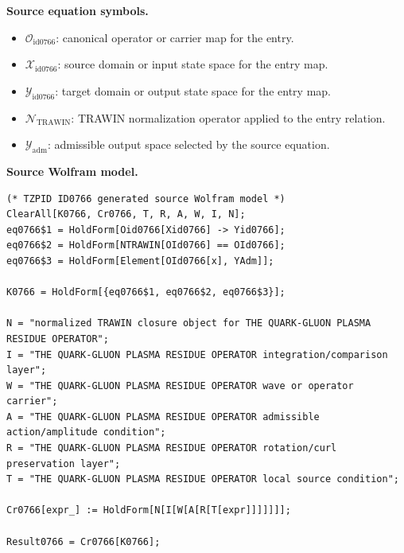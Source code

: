 \begin{minipage}[t]{0.49\linewidth}
\begingroup
\small
\raggedright
\textbf{Source equation symbols.}\par
\begin{itemize}[leftmargin=1.35em,itemsep=1pt,topsep=1pt,parsep=0pt]
    \item $\mathcal{O}_{\mathrm{id0766}}$: canonical operator or carrier map for the entry.
    \item $\mathcal{X}_{\mathrm{id0766}}$: source domain or input state space for the entry map.
    \item $\mathcal{Y}_{\mathrm{id0766}}$: target domain or output state space for the entry map.
    \item $\mathcal{N}_{\mathrm{TRAWIN}}$: TRAWIN normalization operator applied to the entry relation.
    \item $\mathcal{Y}_{\mathrm{adm}}$: admissible output space selected by the source equation.
\end{itemize}
\endgroup
\end{minipage}\hfill
\begin{minipage}[t]{0.47\linewidth}
\begingroup
\scriptsize
\raggedright
\textbf{Source Wolfram model.}\par
\begin{Verbatim}[fontsize=\tiny,breaklines=true,breakanywhere=true]
(* TZPID ID0766 generated source Wolfram model *)
ClearAll[K0766, Cr0766, T, R, A, W, I, N];
eq0766$1 = HoldForm[Oid0766[Xid0766] -> Yid0766];
eq0766$2 = HoldForm[NTRAWIN[OId0766] == OId0766];
eq0766$3 = HoldForm[Element[OId0766[x], YAdm]];

K0766 = HoldForm[{eq0766$1, eq0766$2, eq0766$3}];

N = "normalized TRAWIN closure object for THE QUARK-GLUON PLASMA RESIDUE OPERATOR";
I = "THE QUARK-GLUON PLASMA RESIDUE OPERATOR integration/comparison layer";
W = "THE QUARK-GLUON PLASMA RESIDUE OPERATOR wave or operator carrier";
A = "THE QUARK-GLUON PLASMA RESIDUE OPERATOR admissible action/amplitude condition";
R = "THE QUARK-GLUON PLASMA RESIDUE OPERATOR rotation/curl preservation layer";
T = "THE QUARK-GLUON PLASMA RESIDUE OPERATOR local source condition";

Cr0766[expr_] := HoldForm[N[I[W[A[R[T[expr]]]]]]];

Result0766 = Cr0766[K0766];
\end{Verbatim}
\endgroup
\end{minipage}


